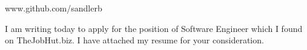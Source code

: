 \documentclass{cover_letter}
\begin{document}


            {www.github.com/sandlerb}

\dividingline{}




\par I am writing today to apply for the position of Software Engineer which I
found on TheJobHut.biz.  I have attached my resume for your consideration.
\end{document}
